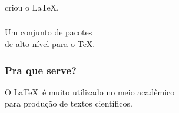 \documentclass[aspectratio=169]{beamer}
\begin{document}
{%

  \begin{frame}
    \begin{center}
      \vspace{.7\paperheight}
      \Huge \color{blue}{Leslie Lamport}
    \end{center}
  \end{frame}
}

\begin{frame}\frametitle{}
  \begin{center}
    \Huge criou o \LaTeX.
  \end{center}
\end{frame}

\begin{frame}\frametitle{}
  \begin{center}
    \Huge Um conjunto de pacotes \\ de alto nível para o \TeX.
  \end{center}
\end{frame}

\begin{frame}\frametitle{Pra que serve?}
  \begin{center}
    \Large O \LaTeX\ é muito utilizado no meio acadêmico \\ para produção de textos científicos.
  \end{center}
\end{frame}
\end{document}

